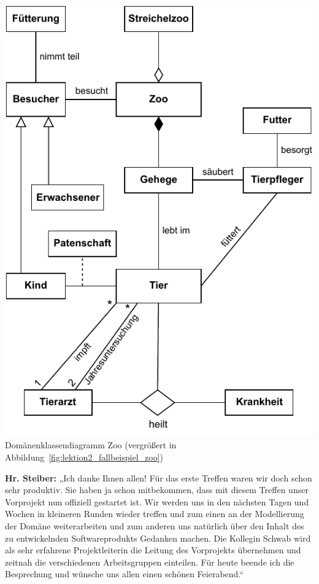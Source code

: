 \begin{center}
\begin{minipage}[c]{.33\linewidth}
		\hyperref[fig:lektion2_fallbeispiel_zoo]{\includegraphics[width=\linewidth]{Bilder/Zoo/fallbeispiel_zoo.pdf}}
		Domänenklassendiagramm Zoo (vergrößert in Abbildung~\ref{fig:lektion2_fallbeispiel_zoo})
	\end{minipage}
\end{center}

\textbf{Hr. Steiber:} „Ich danke Ihnen allen! Für das erste Treffen waren wir doch schon sehr produktiv. Sie haben ja schon mitbekommen, dass mit diesem Treffen unser Vorprojekt nun offiziell gestartet ist. Wir werden uns in den nächsten Tagen und Wochen in kleineren Runden wieder treffen und zum einen an der Modellierung der Domäne weiterarbeiten und zum anderen uns natürlich über den Inhalt des zu entwickelnden Softwareprodukts Gedanken machen. Die Kollegin Schwab wird als sehr erfahrene Projektleiterin die Leitung des Vorprojekts übernehmen und zeitnah die verschiedenen Arbeitsgruppen einteilen. Für heute beende ich die Besprechung und wünsche uns allen einen schönen Feierabend.“

